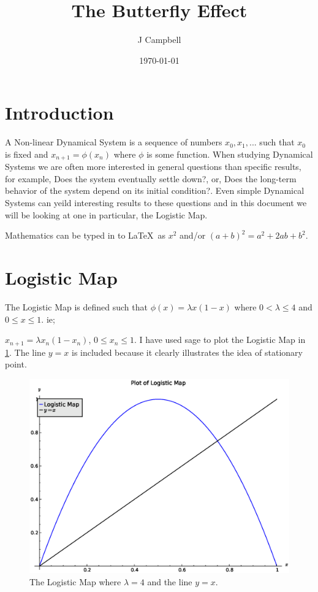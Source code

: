 \documentclass[a4paper]{article}
\title{The Butterfly Effect}
\author{J Campbell}
\date{\today}
\begin{document}

\maketitle

\section{Introduction}
A Non-linear Dynamical System is a sequence of numbers $x_0, x_1, ...$ such that $x_0$ is fixed and $x_{n+1} = \phi(x_n)$ where $\phi$ is some function. When studying Dynamical Systems we are often more interested in general questions than specific results, for example, Does the system eventually settle down?, or, Does the long-term behavior of the system depend on its initial condition?. Even simple Dynamical Systems can yeild interesting results to these questions and in this document we will be looking at one in particular, the Logistic Map.

Mathematics can be typed in to \LaTeX\ as $x^2$ and/or \((a+b)^2=a^2+2ab+b^2\).


\section{Logistic Map}
The Logistic Map is defined such that $\phi(x)=\lambda x(1-x)$ where $ 0 <\lambda \leq 4$ and $0\leq x\leq 1$. ie;

$x_{n+1} = \lambda x_n(1-x_n)$, $0 \leq x_n \leq 1 $. I have used sage to plot the Logistic Map in \ref{logisticmap}. The line $y=x$ is included because it clearly illustrates the idea of stationary point.
\begin{figure}[htdp]
\begin{center}
\includegraphics[scale=0.4]{images/logisticmap}
\end{center}
\caption{The Logistic Map where $\lambda = 4$ and the line $y = x$.}
\label{logisticmap}
\end{figure}
\end{document}
